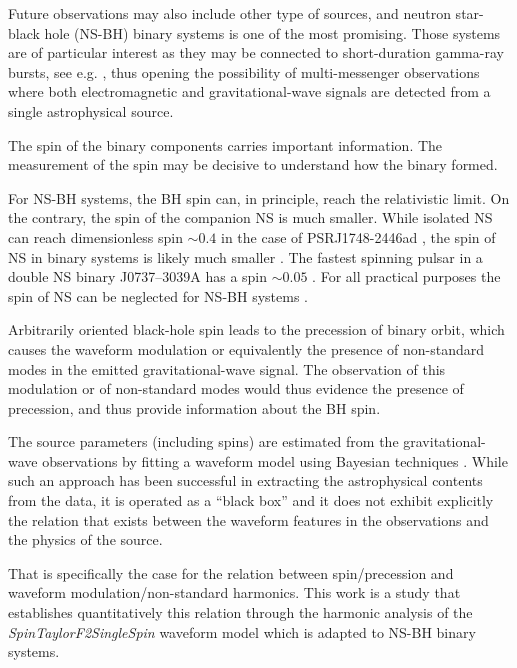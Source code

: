 \documentclass[preprint,onecolumn,,tightenlines,superscriptaddress,showpacs,nofootinbib,eqsecnum,amsfonts,amsmath]{revtex4}
\begin{document}
Future observations may also include other type of sources, and neutron
star-black hole (NS-BH) binary systems is one of the most promising. Those
systems are of particular interest as they may be connected to short-duration
gamma-ray bursts, see e.g. \cite{berger14:_short_durat_gamma_ray_burst}, thus
opening the possibility of multi-messenger observations where both
electromagnetic and gravitational-wave signals are detected from a single
astrophysical source.

The spin of the binary components carries important information. The measurement
of the spin may be decisive to understand how the binary formed. 

For NS-BH systems, the BH spin can, in principle, reach the relativistic limit.
On the contrary, the spin of the companion NS is much smaller. While isolated NS
can reach dimensionless spin $\sim 0.4$ in the case of PSRJ1748-2446ad
\cite{PSR2006}, the spin of NS in binary systems is likely much smaller
\cite{BROWN2012}. The fastest spinning pulsar in a double NS binary J0737–3039A
has a spin $\sim 0.05$ \cite{BURGAY2003}. For all practical purposes the spin of
NS can be neglected for NS-BH systems \cite{Lorimer:2008se}.

Arbitrarily oriented black-hole spin leads to the precession of binary orbit,
which causes the waveform modulation or equivalently the presence of
non-standard modes in the emitted gravitational-wave signal. The observation of
this modulation or of non-standard modes would thus evidence the presence of
precession, and thus provide information about the BH spin.

The source parameters (including spins) are estimated from the
gravitational-wave observations by fitting a waveform model using Bayesian
techniques \cite{Veitch:2014wba}. While such an approach has been successful in extracting
the astrophysical contents from the data, it is operated as a ``black box'' and
it does not exhibit explicitly the relation that exists between the waveform
features in the observations and the physics of the source.

That is specifically the case for the relation between spin/precession and
waveform modulation/non-standard harmonics. This work is a study that
establishes quantitatively this relation through the harmonic analysis
of the {\it SpinTaylorF2SingleSpin} waveform model \cite{AS2014} which
is adapted to NS-BH binary systems.
 
\end{document}
